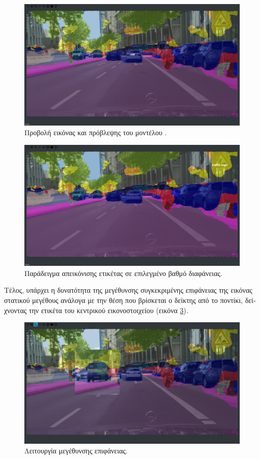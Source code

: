 \begin{figure}[H]
 \centering
 \includegraphics[width=\textwidth, scale=0.3]{Images/viewer_3}
\caption[\textgreek{Προβολή Ετικέτας}]{\textgreek{Προβολή εικόνας και πρόβλεψης του μοντέλου} .}
 \label{fig:viewer_3}
\end{figure}

\begin{figure}[H]
 \centering
 \includegraphics[width=\textwidth, scale=0.3]{Images/viewer_4}
\caption[\textgreek{Παράδειγμα Διαφάνειας}]{\textgreek{Παράδειγμα απεικόνισης ετικέτας σε επιλεγμένο βαθμό διαφάνειας.}}
 \label{fig:viewer_4}
\end{figure}

\textgreek{Τέλος, υπάρχει η δυνατότητα της μεγέθυνσης συγκεκριμένης επιφάνειας της εικόνας στατικού μεγέθους ανάλογα με την θέση που βρίσκεται ο δείκτης από το ποντίκι, δείχνοντας την ετικέτα του κεντρικού εικονοστοιχείου (εικόνα }\ref{fig:viewer_5}).

\begin{figure}[H]
 \centering
 \includegraphics[width=\textwidth, scale=0.3]{Images/viewer_5}
\caption[\textgreek{Παράδειγμα της Λειτουργίας Μεγέθυνσης}]{\textgreek{Λειτουργία μεγέθυνσης επιφάνειας.}}
 \label{fig:viewer_5}
\end{figure}

